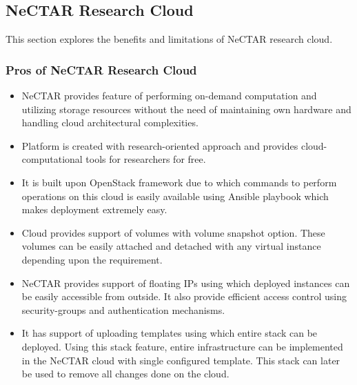\subsection{NeCTAR Research Cloud}
This section explores the benefits and limitations of NeCTAR research cloud.

\subsubsection{Pros of NeCTAR Research Cloud}
\begin{itemize}
    \item NeCTAR provides feature of performing on-demand computation and utilizing storage resources without the need of maintaining own hardware and handling cloud architectural complexities.
    \item Platform is created with research-oriented approach and provides cloud-computational tools for researchers for free.
    \item It is built upon OpenStack framework due to which commands to perform operations on this cloud is easily available using Ansible playbook which makes deployment extremely easy.
    \item Cloud provides support of volumes with volume snapshot option. These volumes can be easily attached and detached with any virtual instance depending upon the requirement.
    \item NeCTAR provides support of floating IPs using which deployed instances can be easily accessible from outside. It also provide efficient access control using security-groups and authentication mechanisms.
    \item It has support of uploading templates using which entire stack can be deployed. Using this stack feature, entire infrastructure can be implemented in the NeCTAR cloud with single configured template. This stack can later be used to remove all changes done on the cloud.
\end{itemize}

